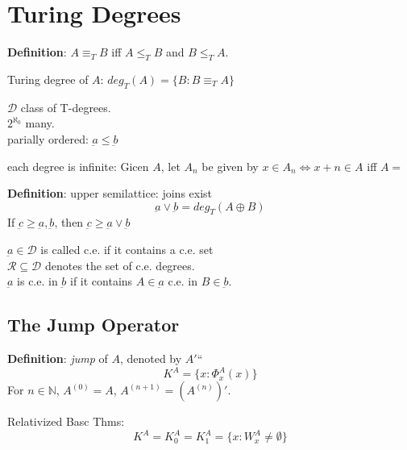\documentclass[12pt]{article}
\newcommand{\Nat}{\ensuremath{\mathbb{N}}}
\newcommand{\defn}{\textbf{Definition}: }
\begin{document}
\section*{Turing Degrees}

\defn $A \equiv_T B$ iff $A \le_T B$ and $B \le_T A$.

Turing degree of $A$:	$deg_T(A) = \{ B : B \equiv_T A \}$

$\mathcal{D}$ class of T-degrees.\\	$2^{\aleph_0}$ many. \\
parially ordered: $\underbar{a} \le \underbar{b}$ %

each degree is infinite: Gicen $A$, let $A_n$ 
be given by $ x \in A_n \Leftrightarrow x + n \in A$
iff $A = $ %

\newcommand{\join}{\vee}
\defn upper semilattice: joins exist
\[
 \underbar{a} \join \underbar{b} = deg_T(A \oplus B)
\]
If $\underbar{c} \ge \underbar{a}, \underbar{b}$, then 
$\underbar{c} \ge \underbar{a} \join \underbar{b}$

$\underbar{a} \in \mathcal{D}$ is called c.e. if it contains a c.e. set \\
$\mathcal{R} \subseteq \mathcal{D}$ denotes the set of c.e. degrees. \\
$\underbar{a}$ is c.e. in $\underbar{b}$ if it contains $A \in \underbar{a}$ c.e. in $B \in \underbar{b}$.

\subsection*{The Jump Operator}
\defn \emph{jump} of $A$, denoted by $A'$``
\[
 K^A = \{ x : \Phi^A_x(x) \}
\]
For $n \in \Nat$, $A^{(0)} = A$, $A^{(n+1)} = (A^{(n)})'$.

Relativized Basc Thms:
\[
 K^A = K^A_0 = K^A_1 = \{ x : W^A_x \ne \emptyset \}
\]
\end{document}
